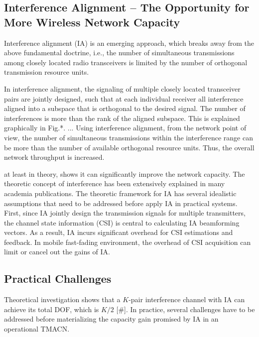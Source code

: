 \documentclass[letterpaper,11pt,onecolumn]{article}
\begin{document}
\subsection{Interference Alignment -- The Opportunity for More Wireless Network Capacity}

Interference alignment (IA) is an emerging approach, which breaks away from the above fundamental doctrine, i.e., the number of simultaneous transmissions among closely located radio transceivers is limited by the number of orthogonal transmission resource units.  

 In interference alignment, the signaling of multiple closely located transceiver pairs are jointly designed, such that at each individual receiver all interference aligned into a subspace that is orthogonal to the desired signal. The number of interferences is more than the rank of the aligned subspace. This is explained graphically in Fig.*. ... Using interference alignment, from the network point of view, the number of simultaneous transmissions within the interference range can be more than the number of available orthogonal resource units. Thus, the overall network throughput is increased.



at least in theory, shows it can significantly improve the network capacity. The theoretic concept of interference has been extensively explained in many academia publications. The theoretic framework for IA has several idealistic assumptions that need to be addressed before apply IA in practical systems. First, since IA jointly design the transmission signals for multiple transmitters, the channel state information (CSI) is central to calculating IA beamforming vectors. As a result, IA incurs significant overhead for CSI estimations and feedback. In mobile fast-fading environment, the overhead of CSI acquisition can limit or cancel out the gains of IA. 

\subsection{Practical Challenges}

Theoretical investigation shows that a $K$-pair interference channel with IA can achieve its total DOF, which is $K/2$ [\#].  In practice, several challenges have to be addressed before materializing the capacity gain promised by IA in an operational TMACN.
\end{document}
